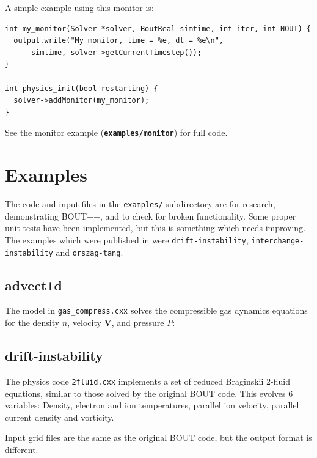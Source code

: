 \documentclass[12pt]{article}
\newcommand{\file}[1]{\texttt{\bf #1}}
\begin{document}
A simple example using this monitor is:
\begin{lstlisting}
int my_monitor(Solver *solver, BoutReal simtime, int iter, int NOUT) {
  output.write("My monitor, time = %e, dt = %e\n", 
      simtime, solver->getCurrentTimestep());
}

int physics_init(bool restarting) {
  solver->addMonitor(my_monitor);
}
\end{lstlisting}

See the monitor example (\file{examples/monitor}) for full code.

\section{Examples}
\label{sec:examples}

The code and input files in the \texttt{examples/} subdirectory are for research, demonstrating BOUT++, 
and to check for broken functionality. Some proper unit tests have been implemented, but this
is something which needs improving. The examples which were published in \cite{Dudson2009,dudson-2008-arxiv}
were \texttt{drift-instability}, \texttt{interchange-instability} and \texttt{orszag-tang}.


\subsection{advect1d}

The model in \texttt{gas\_compress.cxx} solves the compressible gas dynamics equations for
the density $n$, velocity $\mathbf{V}$, and pressure $P$:

\subsection{drift-instability}

The physics code \texttt{2fluid.cxx} implements a set of reduced Braginskii 2-fluid equations,
similar to those solved by the original BOUT code.
This evolves 6 variables: Density, electron and ion temperatures, parallel ion velocity,
parallel current density and vorticity.

Input grid files are the same as the original BOUT code, but the output format is different.
\end{document}
